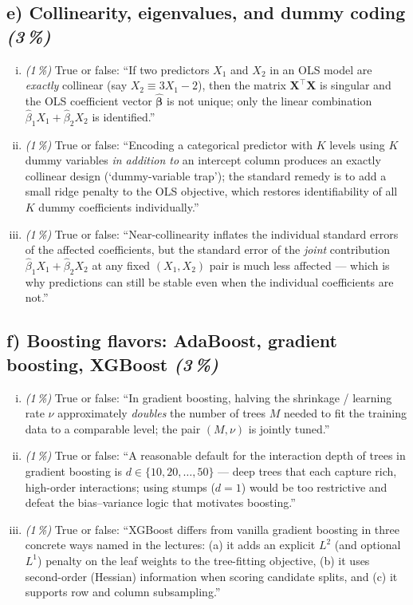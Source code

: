 \documentclass[11pt,a4paper]{article}
\newcommand{\subpoints}[1]{\textit{(#1\,\%)}}
\begin{document}
\subsection*{e) Collinearity, eigenvalues, and dummy coding \subpoints{3}}
\begin{enumerate}[(i)]
  \item \subpoints{1} True or false: ``If two predictors $X_1$ and $X_2$ in an OLS model are \emph{exactly} collinear (say $X_2 \equiv 3 X_1 - 2$), then the matrix $\mathbf{X}^\top\mathbf{X}$ is singular and the OLS coefficient vector $\hat{\boldsymbol\beta}$ is not unique; only the linear combination $\hat\beta_1 X_1 + \hat\beta_2 X_2$ is identified.''
  \item \subpoints{1} True or false: ``Encoding a categorical predictor with $K$ levels using $K$ dummy variables \emph{in addition to} an intercept column produces an exactly collinear design (`dummy-variable trap'); the standard remedy is to add a small ridge penalty to the OLS objective, which restores identifiability of all $K$ dummy coefficients individually.''
  \item \subpoints{1} True or false: ``Near-collinearity inflates the individual standard errors of the affected coefficients, but the standard error of the \emph{joint} contribution $\hat\beta_1 X_1 + \hat\beta_2 X_2$ at any fixed $(X_1, X_2)$ pair is much less affected --- which is why predictions can still be stable even when the individual coefficients are not.''
\end{enumerate}

\subsection*{f) Boosting flavors: AdaBoost, gradient boosting, XGBoost \subpoints{3}}
\begin{enumerate}[(i)]
  \item \subpoints{1} True or false: ``In gradient boosting, halving the shrinkage / learning rate $\nu$ approximately \emph{doubles} the number of trees $M$ needed to fit the training data to a comparable level; the pair $(M, \nu)$ is jointly tuned.''
  \item \subpoints{1} True or false: ``A reasonable default for the interaction depth of trees in gradient boosting is $d \in \{10, 20, \dots, 50\}$ --- deep trees that each capture rich, high-order interactions; using stumps ($d = 1$) would be too restrictive and defeat the bias--variance logic that motivates boosting.''
  \item \subpoints{1} True or false: ``XGBoost differs from vanilla gradient boosting in three concrete ways named in the lectures: (a) it adds an explicit $L^2$ (and optional $L^1$) penalty on the leaf weights to the tree-fitting objective, (b) it uses second-order (Hessian) information when scoring candidate splits, and (c) it supports row and column subsampling.''
\end{enumerate}
\end{document}
